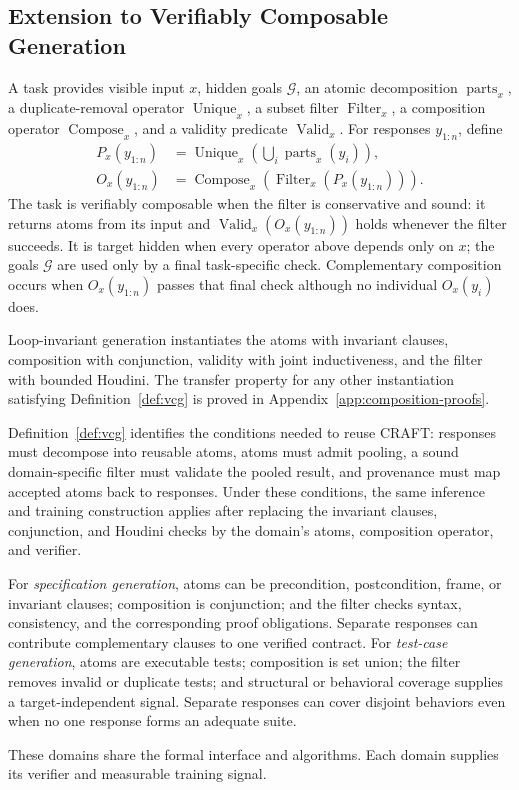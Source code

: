 \subsection{Extension to Verifiably Composable Generation}

\begin{definition}
\label{def:vcg}
A task provides visible input \(x\), hidden goals \(\mathcal G\), an atomic
decomposition \(\operatorname{parts}_x\), a duplicate-removal operator
\(\operatorname{Unique}_x\), a subset filter \(\operatorname{Filter}_x\), a
composition operator \(\operatorname{Compose}_x\), and a validity predicate
\(\operatorname{Valid}_x\).  For responses \(y_{1:n}\), define
\begin{align}
  P_x(y_{1:n})
    &=\operatorname{Unique}_x\!\left(\bigcup_i
      \operatorname{parts}_x(y_i)\right),\\
  O_x(y_{1:n})
    &=\operatorname{Compose}_x\!\left(
      \operatorname{Filter}_x(P_x(y_{1:n}))\right).
  \label{eq:formal-general-pipeline}
\end{align}
The task is verifiably composable when the filter is conservative and sound:
it returns atoms from its input and
\(\operatorname{Valid}_x(O_x(y_{1:n}))\) holds whenever the filter succeeds.
It is target hidden when every operator above depends only on \(x\); the goals
\(\mathcal G\) are used only by a final task-specific check.  Complementary
composition occurs when \(O_x(y_{1:n})\) passes that final check although no
individual \(O_x(y_i)\) does.
\end{definition}

Loop-invariant generation instantiates the atoms with invariant clauses,
composition with conjunction, validity with joint inductiveness, and the
filter with bounded Houdini.  The transfer property for any other
instantiation satisfying Definition~\ref{def:vcg} is proved in
Appendix~\ref{app:composition-proofs}.

Definition~\ref{def:vcg} identifies the conditions needed to reuse CRAFT:
responses must decompose into reusable atoms, atoms must admit pooling, a
sound domain-specific filter must validate the pooled result, and provenance
must map accepted atoms back to responses.  Under these conditions, the same
inference and training construction applies after replacing the invariant
clauses, conjunction, and Houdini checks by the domain's atoms, composition
operator, and verifier.

For \emph{specification generation}, atoms can be precondition,
postcondition, frame, or invariant clauses; composition is conjunction; and
the filter checks syntax, consistency, and the corresponding proof
obligations.  Separate responses can contribute complementary clauses to one
verified contract.  For \emph{test-case generation}, atoms are executable
tests; composition is set union; the filter removes invalid or duplicate
tests; and structural or behavioral coverage supplies a target-independent
signal.  Separate responses can cover disjoint behaviors even when no one
response forms an adequate suite.

These domains share the formal interface and algorithms.  Each domain supplies
its verifier and measurable training signal.
